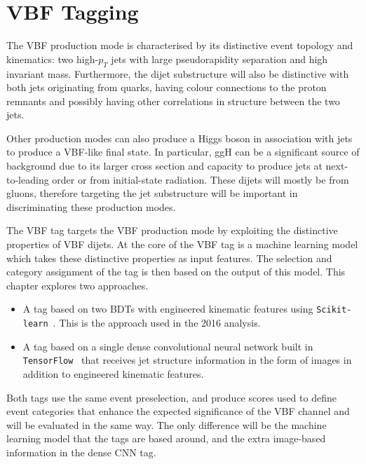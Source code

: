 \section{VBF Tagging}
The VBF production mode is characterised by its distinctive event topology and kinematics: two high-$p_{T}$ jets with large pseudorapidity separation and high invariant mass. Furthermore, the dijet substructure will also be distinctive with both jets originating from quarks, having colour connections to the proton remnants and possibly having other correlations in structure between the two jets. 

Other production modes can also produce a Higgs boson in association with jets to produce a VBF-like final state. 
In particular, ggH can be a significant source of background due to its larger cross section and capacity to produce jets at next-to-leading order or from initial-state radiation. 
These dijets will mostly be from gluons, therefore targeting the jet substructure will be important in discriminating these production modes. 


The VBF tag targets the VBF production mode by exploiting the distinctive properties of VBF dijets. 
At the core of the VBF tag is a machine learning model which takes these distinctive properties as input features. 
The selection and category assignment of the tag is then based on the output of this model.
This chapter explores two approaches.
\begin{itemize}[noitemsep]
    \item A tag based on two BDTs with engineered kinematic features using \texttt{Scikit-learn}~\cite{SKLearn}. This is the approach used in the 2016 \Hgg analysis. 
    \item A tag based on a single dense convolutional neural network built in \texttt{TensorFlow}~\cite{TensorFlow} that receives jet structure information in the form of images in addition to engineered kinematic features. 
\end{itemize}
Both tags use the same event preselection, and produce scores used to define event categories that enhance the expected significance of the VBF channel and will be evaluated in the same way. The only difference will be the machine learning model that the tags are based around, and the extra image-based information in the dense CNN tag.  

